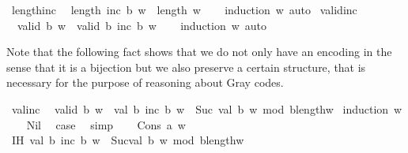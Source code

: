 \begin{isabellebody}
\isanewline
{}\isamarkupfalse%
\ length{\isacharunderscore}{\kern0pt}inc{\isacharcolon}{\kern0pt}\isanewline
\ \ {\isachardoublequoteopen}length\ {\isacharparenleft}{\kern0pt}inc\ b\ w{\isacharparenright}{\kern0pt}\ {\isacharequal}{\kern0pt}\ length\ w{\isachardoublequoteclose}\isanewline
%
\isadelimproof
\ \ %
\endisadelimproof
%
\isatagproof
{}\isamarkupfalse%
\ {\isacharparenleft}{\kern0pt}induction\ w{\isacharparenright}{\kern0pt}\ auto%
\endisatagproof
{\isafoldproof}%
%
\isadelimproof
\isanewline
%
\endisadelimproof
\isanewline
{}\isamarkupfalse%
\ valid{\isacharunderscore}{\kern0pt}inc{\isacharcolon}{\kern0pt}\isanewline
\ \ {\isachardoublequoteopen}valid\ b\ w\ {\isasymLongrightarrow}\ valid\ b\ {\isacharparenleft}{\kern0pt}inc\ b\ w{\isacharparenright}{\kern0pt}{\isachardoublequoteclose}\isanewline
%
\isadelimproof
\ \ %
\endisadelimproof
%
\isatagproof
{}\isamarkupfalse%
\ {\isacharparenleft}{\kern0pt}induction\ w{\isacharparenright}{\kern0pt}\ auto%
\endisatagproof
{\isafoldproof}%
%
\isadelimproof
%
\endisadelimproof
%
\begin{isamarkuptext}%
Note that the following fact shows that we do not only have an encoding
  in the sense that it is a bijection but we also preserve a certain structure,
  that is necessary for the purpose of reasoning about Gray codes.%
\end{isamarkuptext}\isamarkuptrue%
\isamarkupfalse%
\ val{\isacharunderscore}{\kern0pt}inc{\isacharcolon}{\kern0pt}\isanewline
\ \ {\isachardoublequoteopen}valid\ b\ w\ {\isasymLongrightarrow}\ val\ b\ {\isacharparenleft}{\kern0pt}inc\ b\ w{\isacharparenright}{\kern0pt}\ {\isacharequal}{\kern0pt}\ Suc\ {\isacharparenleft}{\kern0pt}val\ b\ w{\isacharparenright}{\kern0pt}\ mod\ b{\isacharcircum}{\kern0pt}length{\isacharparenleft}{\kern0pt}w{\isacharparenright}{\kern0pt}{\isachardoublequoteclose}\isanewline
%
\isadelimproof
%
\endisadelimproof
%
\isatagproof
{}\isamarkupfalse%
\ {\isacharparenleft}{\kern0pt}induction\ w{\isacharparenright}{\kern0pt}\isanewline
\ \ \isamarkupfalse%
\ Nil\ \isamarkupfalse%
\ {\isacharquery}{\kern0pt}case\ \isamarkupfalse%
\ simp\isanewline
{}\isamarkupfalse%
\isanewline
\ \ \isamarkupfalse%
\ {\isacharparenleft}{\kern0pt}Cons\ a\ w{\isacharparenright}{\kern0pt}\isanewline
\ \ \isamarkupfalse%
\ IH{\isacharcolon}{\kern0pt}\ {\isachardoublequoteopen}val\ b\ {\isacharparenleft}{\kern0pt}inc\ b\ w{\isacharparenright}{\kern0pt}\ {\isacharequal}{\kern0pt}\ Suc{\isacharparenleft}{\kern0pt}val\ b\ w{\isacharparenright}{\kern0pt}\ mod\ b{\isacharcircum}{\kern0pt}length{\isacharparenleft}{\kern0pt}w{\isacharparenright}{\kern0pt}{\isachardoublequoteclose}\ \isamarkupfalse%

\end{isabellebody}
